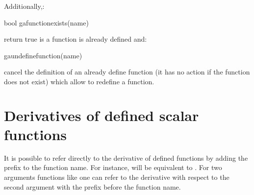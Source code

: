 \documentclass[a4paper,11pt,english]{sphinxmanual}
\begin{document}
Additionally,:

\begin{sphinxVerbatim}[commandchars=\\\{\}]
bool ga\PYGZus{}function\PYGZus{}exists(name)
\end{sphinxVerbatim}

return true is a function  is already defined and:

\begin{sphinxVerbatim}[commandchars=\\\{\}]
ga\PYGZus{}undefine\PYGZus{}function(name)
\end{sphinxVerbatim}

cancel the definition of an already define function (it has no action if the function does not exist) which allow to redefine a function.


\section{Derivatives of defined scalar functions}
\label{\detokenize{userdoc/gasm_high:derivatives-of-defined-scalar-functions}}
It is possible to refer directly to the derivative of defined functions by adding the prefix  to the function name. For instance,  will be equivalent to . For two arguments functions like  one can refer to the derivative with respect to the second argument with the prefix   before the function name.
\end{document}
